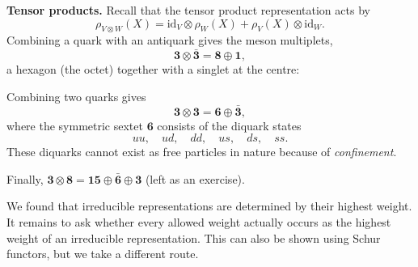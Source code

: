 {    \medskip
    \textbf{Tensor products.}\quad
    Recall that the tensor product representation acts by
    \[
        \rho_{V\otimes W}(X) = \mathrm{id}_V \otimes \rho_W(X) + \rho_V(X) \otimes \mathrm{id}_W .
    \]
    Combining a quark with an antiquark gives the meson multiplets,
    \[
        \mathbf{3} \otimes \bar{\mathbf{3}} = \mathbf{8} \oplus \mathbf{1},
    \]
    a hexagon (the octet) together with a singlet at the centre:
    \begin{center}
    \end{center}
    Combining two quarks gives
    \[
        \mathbf{3} \otimes \mathbf{3} = \mathbf{6} \oplus \bar{\mathbf{3}},
    \]
    where the symmetric sextet $\mathbf{6}$ consists of the diquark states
    \[
        uu,\quad ud,\quad dd,\quad us,\quad ds,\quad ss.
    \]
    These diquarks cannot exist as free particles in nature because of \emph{confinement}.

    \medskip
    Finally, $\mathbf{3} \otimes \mathbf{8} = \mathbf{15} \oplus \bar{\mathbf{6}} \oplus \mathbf{3}$
    (left as an exercise).
}

We found that irreducible representations are determined by their highest weight. It remains
to ask whether every allowed weight actually occurs as the highest weight of an irreducible
representation. This can also be shown using Schur functors, but we take a different route.

